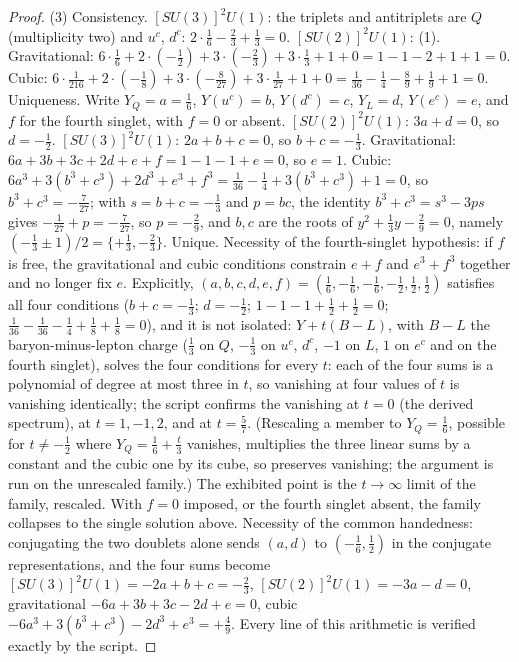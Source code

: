 \documentclass[11pt]{article}
\theoremstyle{definition}
\theoremstyle{plain}
\begin{document}
\begin{proof}
(3) Consistency. $[SU(3)]^{2}U(1)$: the triplets and antitriplets are $Q$ (multiplicity two) and $u^{c}$, $d^{c}$: $2 \cdot \tfrac16 - \tfrac23 + \tfrac13 = 0$. $[SU(2)]^{2}U(1)$: (1). Gravitational: $6 \cdot \tfrac16 + 2 \cdot (-\tfrac12) + 3 \cdot (-\tfrac23) + 3 \cdot \tfrac13 + 1 + 0 = 1 - 1 - 2 + 1 + 1 = 0$. Cubic: $6 \cdot \tfrac{1}{216} + 2 \cdot (-\tfrac18) + 3 \cdot (-\tfrac{8}{27}) + 3 \cdot \tfrac{1}{27} + 1 + 0 = \tfrac{1}{36} - \tfrac14 - \tfrac89 + \tfrac19 + 1 = 0$. Uniqueness. Write $Y_{Q} = a = \tfrac16$, $Y(u^{c}) = b$, $Y(d^{c}) = c$, $Y_{L} = d$, $Y(e^{c}) = e$, and $f$ for the fourth singlet, with $f = 0$ or absent. $[SU(2)]^{2}U(1)$: $3a + d = 0$, so $d = -\tfrac12$. $[SU(3)]^{2}U(1)$: $2a + b + c = 0$, so $b + c = -\tfrac13$. Gravitational: $6a + 3b + 3c + 2d + e + f = 1 - 1 - 1 + e = 0$, so $e = 1$. Cubic: $6a^{3} + 3(b^{3} + c^{3}) + 2d^{3} + e^{3} + f^{3} = \tfrac{1}{36} - \tfrac14 + 3(b^{3} + c^{3}) + 1 = 0$, so $b^{3} + c^{3} = -\tfrac{7}{27}$; with $s = b + c = -\tfrac13$ and $p = bc$, the identity $b^{3} + c^{3} = s^{3} - 3ps$ gives $-\tfrac{1}{27} + p = -\tfrac{7}{27}$, so $p = -\tfrac29$, and $b, c$ are the roots of $y^{2} + \tfrac13 y - \tfrac29 = 0$, namely $(-\tfrac13 \pm 1)/2 = \{+\tfrac13, -\tfrac23\}$. Unique. Necessity of the fourth-singlet hypothesis: if $f$ is free, the gravitational and cubic conditions constrain $e + f$ and $e^{3} + f^{3}$ together and no longer fix $e$. Explicitly, $(a, b, c, d, e, f) = (\tfrac16, -\tfrac16, -\tfrac16, -\tfrac12, \tfrac12, \tfrac12)$ satisfies all four conditions ($b + c = -\tfrac13$; $d = -\tfrac12$; $1 - 1 - 1 + \tfrac12 + \tfrac12 = 0$; $\tfrac{1}{36} - \tfrac{1}{36} - \tfrac14 + \tfrac18 + \tfrac18 = 0$), and it is not isolated: $Y + t(B - L)$, with $B - L$ the baryon-minus-lepton charge ($\tfrac13$ on $Q$, $-\tfrac13$ on $u^{c}$, $d^{c}$, $-1$ on $L$, $1$ on $e^{c}$ and on the fourth singlet), solves the four conditions for every $t$: each of the four sums is a polynomial of degree at most three in $t$, so vanishing at four values of $t$ is vanishing identically; the script confirms the vanishing at $t = 0$ (the derived spectrum), at $t = 1, -1, 2$, and at $t = \tfrac57$. (Rescaling a member to $Y_{Q} = \tfrac16$, possible for $t \neq -\tfrac12$ where $Y_{Q} = \tfrac16 + \tfrac{t}{3}$ vanishes, multiplies the three linear sums by a constant and the cubic one by its cube, so preserves vanishing; the argument is run on the unrescaled family.) The exhibited point is the $t \to \infty$ limit of the family, rescaled. With $f = 0$ imposed, or the fourth singlet absent, the family collapses to the single solution above. Necessity of the common handedness: conjugating the two doublets alone sends $(a, d)$ to $(-\tfrac16, \tfrac12)$ in the conjugate representations, and the four sums become $[SU(3)]^{2}U(1) = -2a + b + c = -\tfrac23$, $[SU(2)]^{2}U(1) = -3a - d = 0$, gravitational $-6a + 3b + 3c - 2d + e = 0$, cubic $-6a^{3} + 3(b^{3} + c^{3}) - 2d^{3} + e^{3} = +\tfrac49$. Every line of this arithmetic is verified exactly by the script.

\end{proof}
\end{document}
